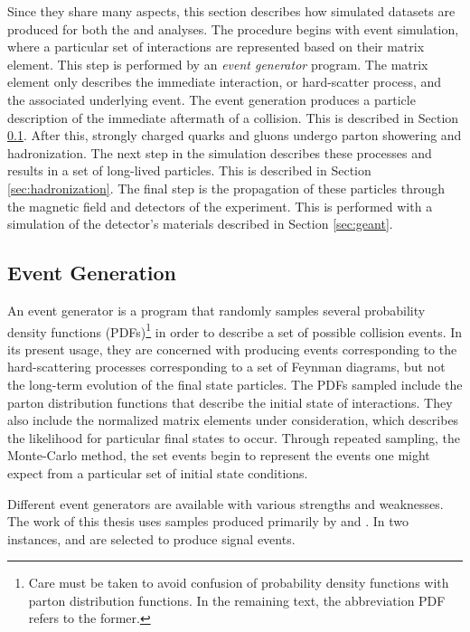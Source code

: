 Since they share many aspects, this section describes how simulated datasets are produced for both the \hmm and \nr analyses.
The procedure begins with event simulation, where a particular set of interactions are represented based on their matrix element.
This step is performed by an \emph{event generator} program.
The matrix element only describes the immediate interaction, or hard-scatter process, and the associated underlying event.
The event generation produces a particle description of the immediate aftermath of a collision. This is described in Section \ref{sec:evtGen}.
After this, strongly charged quarks and gluons undergo parton showering and hadronization.
The next step in the simulation describes these processes and results in a set of long-lived particles. This is described in Section \ref{sec:hadronization}.
The final step is the propagation of these particles through the magnetic field and detectors of the experiment.
This is performed with a simulation of the detector's materials described in Section \ref{sec:geant}.

\subsection{Event Generation} \label{sec:evtGen}

An event generator is a program that randomly samples several probability density functions (PDFs)\footnote{Care must be taken to avoid confusion of probability density functions with parton distribution functions. In the remaining text, the abbreviation PDF refers to the former.} in order to describe a set of possible collision events.
In its present usage, they are concerned with producing events corresponding to the hard-scattering processes corresponding to a set of Feynman diagrams, but not the long-term evolution of the final state particles.
The PDFs sampled include the parton distribution functions that describe the initial state of interactions.
They also include the normalized matrix elements under consideration, which describes the likelihood for particular final states to occur.
Through repeated sampling, the Monte-Carlo method, the set events begin to represent the events one might expect from a particular set of initial state conditions.

Different event generators are available with various strengths and weaknesses.
The work of this thesis uses samples produced primarily by \sherpa \cite{Gleisberg:2008ta} and \powheg \cite{Alioli:2010xd,Frixione:2007vw}.
In two instances, \pythia \cite{pythia8} and \madgraph \cite{Alwall:2014hca} are selected to produce signal events.

